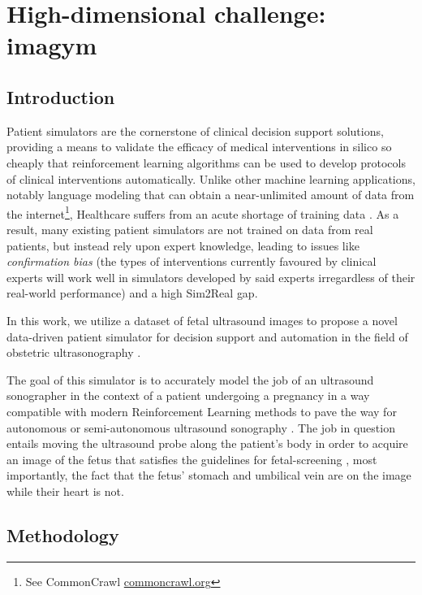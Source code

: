 \chapter{High-dimensional challenge: imagym}
\label{ch:imagym}

\section{Introduction}

Patient simulators are the cornerstone of clinical decision support solutions, providing a means to validate the efficacy of medical interventions in silico so cheaply that reinforcement learning algorithms can be used to develop protocols of clinical interventions automatically.
Unlike other machine learning applications, notably language modeling that can obtain a near-unlimited amount of data from the internet\footnote{See CommonCrawl \cite{commoncrawl} \url{commoncrawl.org}}, Healthcare suffers from an acute shortage of training data \cite{datashortage}.
As a result, many existing patient simulators are not trained on data from real patients, but instead rely upon expert knowledge, leading to issues like \emph{confirmation bias} (the types of interventions currently favoured by clinical experts will work well in simulators developed by said experts irregardless of their real-world performance) and a high Sim2Real \cite{sim2real} gap.

In this work, we utilize a dataset of fetal ultrasound images to propose a novel data-driven patient simulator for decision support and automation in the field of obstetric ultrasonography \cite{obstetrics-sonography}.

The goal of this simulator is to accurately model the job of an ultrasound sonographer in the context of a patient undergoing a pregnancy in a way compatible with modern Reinforcement Learning methods \cite{liDeepReinforcementLearning2017}
to pave the way for autonomous or semi-autonomous ultrasound sonography \cite{autonomous-ultrasound-review}.
The job in question entails moving the ultrasound probe along the patient's body in order to acquire an image of the fetus that satisfies the guidelines for fetal-screening \cite{isoug-guidelines}, most importantly, the fact that the fetus' stomach and umbilical vein are on the image while their heart is not.

\newpage
\section{Methodology}

